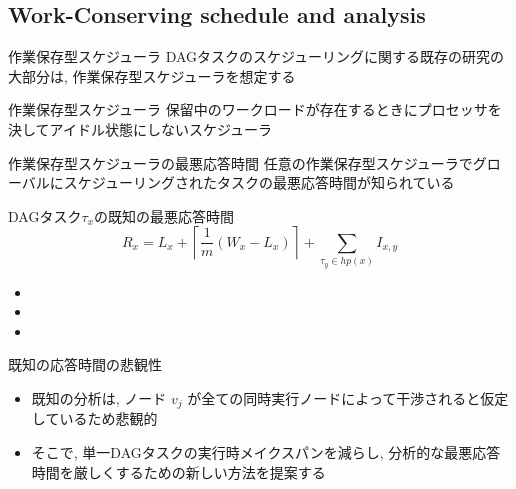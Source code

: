 \subsection{Work-Conserving schedule and analysis}
\label{ssec: wc}

\begin{frame}{作業保存型スケジューラ}
    DAGタスクのスケジューリングに関する既存の研究の大部分は, 作業保存型スケジューラを想定する
    \begin{block}{作業保存型スケジューラ}
        保留中のワークロードが存在するときにプロセッサを決してアイドル状態にしないスケジューラ
    \end{block}
\end{frame}

\begin{frame}[label=oldRes]{作業保存型スケジューラの最悪応答時間}
    任意の作業保存型スケジューラでグローバルにスケジューリングされたタスクの最悪応答時間が知られている
    \begin{block}{DAGタスク$\tau_x$の既知の最悪応答時間}
        \begin{equation*}
            R_{x}=L_{x}+\left\lceil\frac{1}{m}\left(W_{x}-L_{x}\right)\right\rceil+\sum_{\tau_{y} \in h p(x)} I_{x, y}
        \end{equation*}
        \begin{itemize}
            \item {}
            \item {}
            \item {}
        \end{itemize}
    \end{block}
\end{frame}

\begin{frame}{既知の応答時間の悲観性}
    \begin{itemize}
        \item 既知の分析は, ノード $v_{j}$ が全ての同時実行ノードによって干渉されると仮定しているため悲観的
        \item そこで, 単一DAGタスクの実行時メイクスパンを減らし, 分析的な最悪応答時間を厳しくするための新しい方法を提案する
    \end{itemize}
\end{frame}


